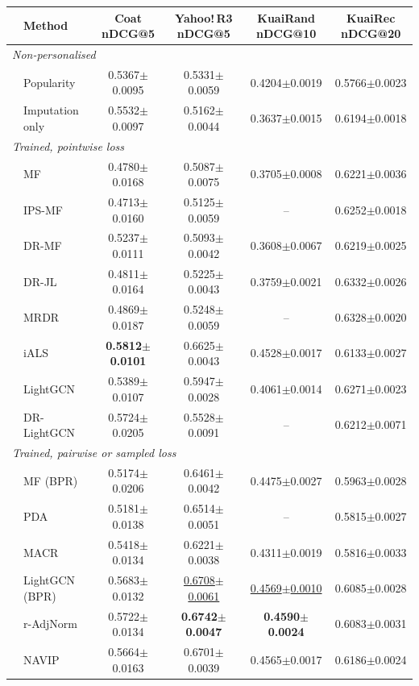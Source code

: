 \begin{tabular}{llcccc}
\toprule
 & Method & Coat nDCG@5 & Yahoo!\,R3 nDCG@5 & KuaiRand nDCG@10 & KuaiRec nDCG@20\\
\midrule
\multicolumn{6}{l}{\emph{Non-personalised}}\\
 & Popularity & 0.5367$\pm$0.0095 & 0.5331$\pm$0.0059 & 0.4204$\pm$0.0019 & 0.5766$\pm$0.0023\\
 & Imputation only & 0.5532$\pm$0.0097 & 0.5162$\pm$0.0044 & 0.3637$\pm$0.0015 & 0.6194$\pm$0.0018\\
\multicolumn{6}{l}{\emph{Trained, pointwise loss}}\\
 & MF & 0.4780$\pm$0.0168 & 0.5087$\pm$0.0075 & 0.3705$\pm$0.0008 & 0.6221$\pm$0.0036\\
 & IPS-MF & 0.4713$\pm$0.0160 & 0.5125$\pm$0.0059 & -- & 0.6252$\pm$0.0018\\
 & DR-MF & 0.5237$\pm$0.0111 & 0.5093$\pm$0.0042 & 0.3608$\pm$0.0067 & 0.6219$\pm$0.0025\\
 & DR-JL & 0.4811$\pm$0.0164 & 0.5225$\pm$0.0043 & 0.3759$\pm$0.0021 & 0.6332$\pm$0.0026\\
 & MRDR & 0.4869$\pm$0.0187 & 0.5248$\pm$0.0059 & -- & 0.6328$\pm$0.0020\\
 & iALS & \textbf{0.5812$\pm$0.0101} & 0.6625$\pm$0.0043 & 0.4528$\pm$0.0017 & 0.6133$\pm$0.0027\\
 & LightGCN & 0.5389$\pm$0.0107 & 0.5947$\pm$0.0028 & 0.4061$\pm$0.0014 & 0.6271$\pm$0.0023\\
 & DR-LightGCN & 0.5724$\pm$0.0205 & 0.5528$\pm$0.0091 & -- & 0.6212$\pm$0.0071\\
\multicolumn{6}{l}{\emph{Trained, pairwise or sampled loss}}\\
 & MF (BPR) & 0.5174$\pm$0.0206 & 0.6461$\pm$0.0042 & 0.4475$\pm$0.0027 & 0.5963$\pm$0.0028\\
 & PDA & 0.5181$\pm$0.0138 & 0.6514$\pm$0.0051 & -- & 0.5815$\pm$0.0027\\
 & MACR & 0.5418$\pm$0.0134 & 0.6221$\pm$0.0038 & 0.4311$\pm$0.0019 & 0.5816$\pm$0.0033\\
 & LightGCN (BPR) & 0.5683$\pm$0.0132 & \underline{0.6708$\pm$0.0061} & \underline{0.4569$\pm$0.0010} & 0.6085$\pm$0.0028\\
 & r-AdjNorm & 0.5722$\pm$0.0134 & \textbf{0.6742$\pm$0.0047} & \textbf{0.4590$\pm$0.0024} & 0.6083$\pm$0.0031\\
 & NAVIP & 0.5664$\pm$0.0163 & 0.6701$\pm$0.0039 & 0.4565$\pm$0.0017 & 0.6186$\pm$0.0024\\

\end{tabular}
